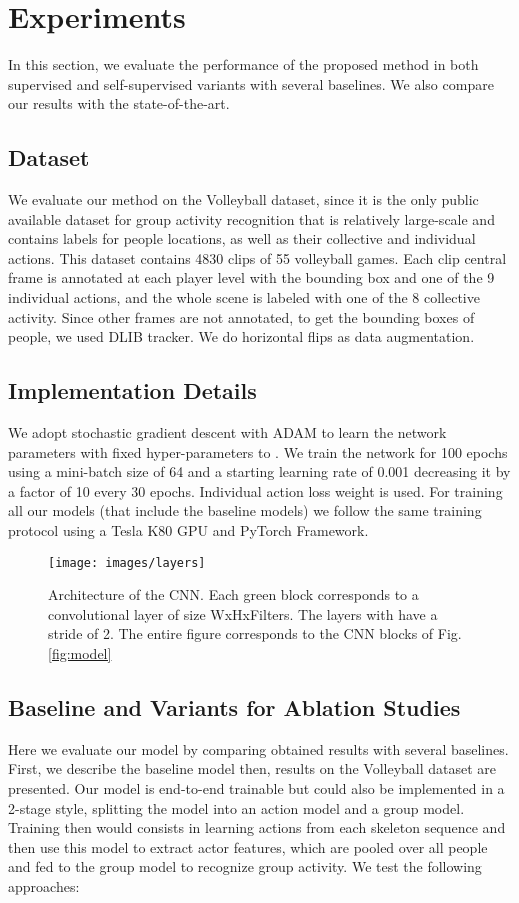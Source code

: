\documentclass[a4paper,conference]{IEEEtran}
\begin{document}
\section{Experiments}
In this section, we evaluate the performance of the proposed method in both supervised and self-supervised variants with several baselines. We also compare our results with the state-of-the-art.

\subsection{Dataset}
We evaluate our method on the Volleyball dataset\cite{msibrahiCVPR16deepactivity}, since it is the only public available dataset for group activity recognition that is relatively large-scale and contains labels for people locations, as well as their collective and individual actions. This dataset contains 4830 clips of 55 volleyball games. Each clip central frame is annotated at each player level with the bounding box and one of the 9 individual actions, and the whole scene is labeled with one of the 8 collective activity. Since other frames are not annotated, to get the bounding boxes of people, we used DLIB tracker\cite{article}. We do horizontal flips as data augmentation.

\subsection{Implementation Details}
We adopt stochastic gradient descent with ADAM to learn the network parameters with fixed hyper-parameters to . We train the network for 100 epochs using a mini-batch size of 64 and a starting learning rate of 0.001 decreasing it by a factor of 10 every 30 epochs. Individual action loss weight  is used. For training all our models (that include the baseline models) we follow the same training protocol using a Tesla K80 GPU and PyTorch Framework.

\begin{figure}[t]
    \texttt{[image: images/layers]}
	\caption{Architecture of the CNN. Each green block corresponds to a convolutional layer of size WxHxFilters. The layers with  have a stride of 2. The entire figure corresponds to the CNN blocks of Fig. \ref{fig:model}}
	\label{fig:architecture}
\end{figure}

\subsection{Baseline and Variants for Ablation Studies}
Here we evaluate our model by comparing obtained results with several baselines. First, we describe the baseline model then, results on the Volleyball dataset are presented. Our model is end-to-end trainable but could also be implemented in a 2-stage style, splitting the model into an action model and a group model. Training then would consists in learning actions from each skeleton sequence and then use this model to extract actor features, which are pooled over all people and fed to the group model to recognize group activity. 
We test the following approaches:
\end{document}
